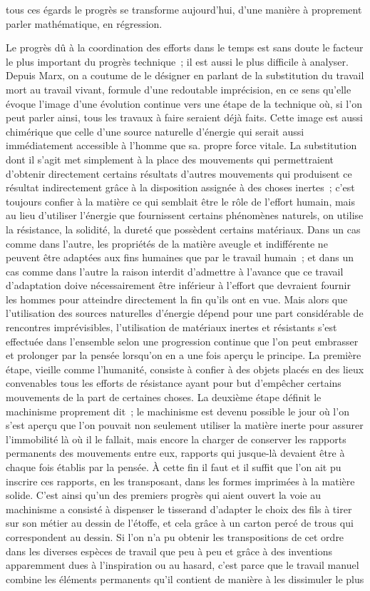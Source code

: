 \documentclass[french,twoside]{book} %
\begin{document}
tous ces égards le progrès se transforme aujourd'hui, d'une manière à proprement parler mathématique, en régression.\par
Le progrès dû à la coordination des efforts dans le temps est sans doute le facteur le plus important du progrès technique ; il est aussi le plus difficile à analyser. Depuis Marx, on a coutume de le désigner en parlant de la substitution du travail mort au travail vivant, formule d'une redoutable imprécision, en ce sens qu'elle évoque l'image d'une évolution continue vers une étape de la technique où, si l'on peut parler ainsi, tous les travaux à faire seraient déjà faits. Cette image est aussi chimérique que celle d'une source naturelle d'énergie qui serait aussi immédiatement accessible à l'homme que sa. propre force vitale. La substitution dont il s'agit met simplement à la place des mouvements qui permettraient d'obtenir directement certains résultats d'autres mouvements qui produisent ce résultat indirectement grâce à la disposition assignée à des choses inertes ; c'est toujours confier à la matière ce qui semblait être le rôle de l'effort humain, mais au lieu d'utiliser l'énergie que fournissent certains phénomènes naturels, on utilise la résistance, la solidité, la dureté que possèdent certains matériaux. Dans un cas comme dans l'autre, les propriétés de la matière aveugle et indifférente ne peuvent être adaptées aux fins humaines que par le travail humain ; et dans un cas comme dans l'autre la raison interdit d'admettre à l'avance que ce travail d'adaptation doive nécessairement être inférieur à l'effort que devraient fournir les hommes pour atteindre directement la fin qu'ils ont en vue. Mais alors que l'utilisation des sources naturelles d'énergie dépend pour une part considérable de rencontres imprévisibles, l'utilisation de matériaux inertes et résistants s'est effectuée dans l'ensemble selon une progression continue que l'on peut embrasser et prolonger par la pensée lorsqu'on en a une fois aperçu le principe. La première étape, vieille comme l'humanité, consiste à confier à des objets placés en des lieux convenables tous les efforts de résistance ayant pour but d'empêcher certains mouvements de la part de certaines choses. La deuxième étape définit le machinisme proprement dit ; le machinisme est devenu possible le jour où l'on s'est aperçu que l'on pouvait non seulement utiliser la matière inerte pour assurer l'immobilité là où il le fallait, mais encore la charger de conserver les rapports permanents des mouvements entre eux, rapports qui jusque-là devaient être à chaque fois établis par la pensée. À cette fin il faut et il suffit que l'on ait pu inscrire ces rapports, en les transposant, dans les formes imprimées à la matière solide. C'est ainsi qu'un des premiers progrès qui aient ouvert la voie au machinisme a consisté à dispenser le tisserand d'adapter le choix des fils à tirer sur son métier au dessin de l'étoffe, et cela grâce à un carton percé de trous qui correspondent au dessin. Si l'on n'a pu obtenir les transpositions de cet ordre dans les diverses espèces de travail que peu à peu et grâce à des inventions apparemment dues à l'inspiration ou au hasard, c'est parce que le travail manuel combine les éléments permanents qu'il contient de manière à les dissimuler le plus 
\end{document}
